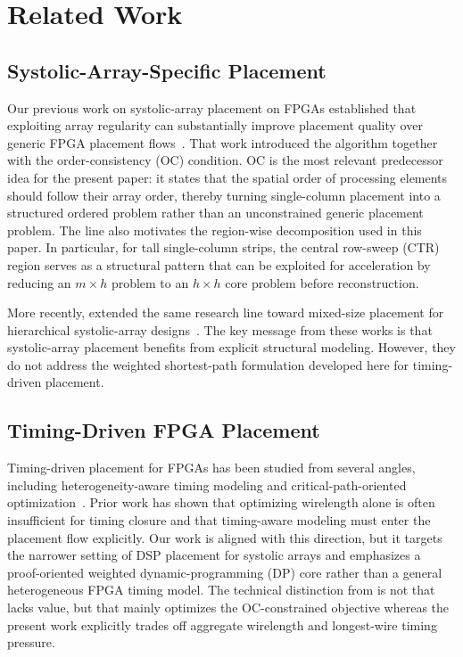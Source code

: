 \section{Related Work}
\label{sec:rw}

\subsection{Systolic-Array-Specific Placement}

Our previous work on systolic-array placement on FPGAs established that exploiting array regularity can substantially improve placement quality over generic FPGA placement flows~\cite{rsad2023}. That work introduced the \rsad algorithm together with the order-consistency (OC) condition. OC is the most relevant predecessor idea for the present paper: it states that the spatial order of processing elements should follow their array order, thereby turning single-column placement into a structured ordered problem rather than an unconstrained generic placement problem. The \rsad line also motivates the region-wise decomposition used in this paper. In particular, for tall single-column strips, the central row-sweep (CTR) region serves as a structural pattern that can be exploited for acceleration by reducing an $m \times h$ problem to an $h \times h$ core problem before reconstruction.

More recently, \sysmix extended the same research line toward mixed-size placement for hierarchical systolic-array designs~\cite{sysmix2024}. The key message from these works is that systolic-array placement benefits from explicit structural modeling. However, they do not address the weighted shortest-path formulation developed here for timing-driven placement.

\subsection{Timing-Driven FPGA Placement}

Timing-driven placement for FPGAs has been studied from several angles, including heterogeneity-aware timing modeling and critical-path-oriented optimization~\cite{date2021,ispd2017}. Prior work has shown that optimizing wirelength alone is often insufficient for timing closure and that timing-aware modeling must enter the placement flow explicitly. Our work is aligned with this direction, but it targets the narrower setting of DSP placement for systolic arrays and emphasizes a proof-oriented weighted dynamic-programming (DP) core rather than a general heterogeneous FPGA timing model. The technical distinction from \rsad is not that \rsad lacks value, but that \rsad mainly optimizes the OC-constrained \hpwl objective whereas the present work explicitly trades off aggregate wirelength and longest-wire timing pressure.
